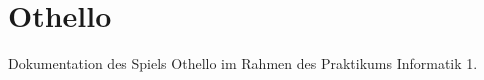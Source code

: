 \chapter{Othello }
\hypertarget{index}{}\label{index}
Dokumentation des Spiels Othello im Rahmen des Praktikums Informatik 1. 